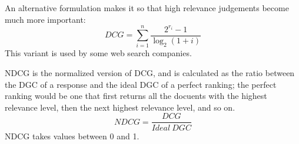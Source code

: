 An alternative formulation makes it so that high relevance judgements become much more important:
\begin{equation*}
    \textit{DCG} = \sum_{i=1}^n \frac{2^{r_i} - 1}{\log_2(1+i)}
\end{equation*}
This variant is used by some web search companies.

NDCG is the normalized version of DCG, and is calculated as the ratio between the DGC of a response and the ideal DGC of a perfect ranking; the perfect ranking would be one that first returns all the docuents with the highest relevance level, then the next highest relevance level, and so on.
\begin{equation*}
    \textit{NDCG} = \frac{DCG}{\textit{Ideal} \ DGC}
\end{equation*}
NDCG takes values between 0 and 1.